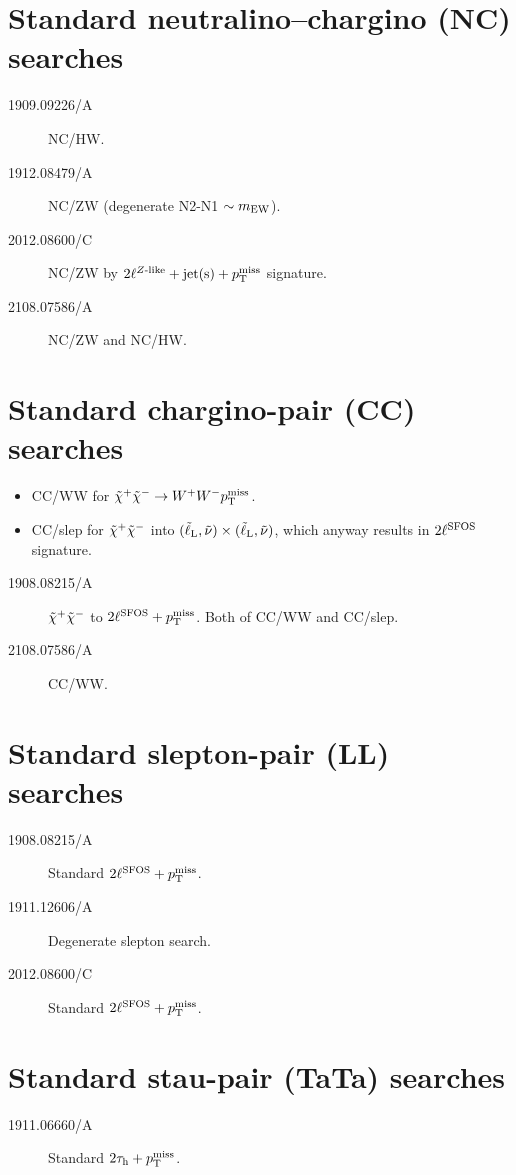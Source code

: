 \section[Standard NC searches]{Standard neutralino--chargino (NC) searches}

\begin{description}
\item[1909.09226/A] NC/HW.
\item[1912.08479/A] NC/ZW (degenerate N2-N1 $\sim m\w{EW}$).
\item[2012.08600/C] NC/ZW by $2\ell\wZlike+\text{jet(s)}+\mpT$ signature.
\item[2108.07586/A] NC/ZW and NC/HW.
\end{description}


\section[Standard CC searches]{Standard chargino-pair (CC) searches}
\begin{itemize}
 \item CC/WW for $\charP\charM\to W^+W^-\mpT$.
 \item CC/slep for $\tilde\chi^+_{\relax}\tilde\chi^-_{\relax}$ into $(\slepL,\snu)\times(\slepL,\snu)$, which anyway results in $2\ell\wSFOS$ signature.
\end{itemize}


\begin{description}
\item[1908.08215/A] $\tilde\chi^+_{\relax}\tilde\chi^-_{\relax}$ to $2\ell\wSFOS+\mpT$. Both of CC/WW and CC/slep.
\item[2108.07586/A] CC/WW.
\end{description}



\section[Standard LL searches]{Standard slepton-pair (LL) searches}
\begin{description}
\item[1908.08215/A] Standard $2\ell\wSFOS+\mpT$.
\item[1911.12606/A] Degenerate slepton search.
\item[2012.08600/C] Standard $2\ell\wSFOS+\mpT$.
\end{description}

\section[Standard TaTa searches]{Standard stau-pair (TaTa) searches}
\begin{description}
\item[1911.06660/A] Standard $2\tauh+\mpT$.
\end{description}


